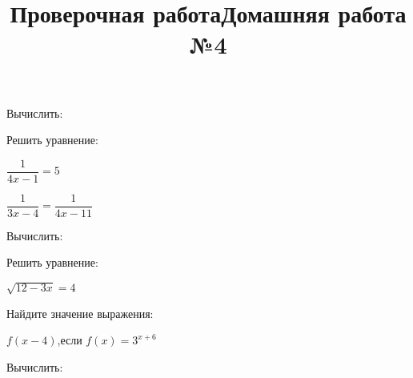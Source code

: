 \newpage
\title{Проверочная работа}
\begin{listofex}
	\item {}
	\item Вычислить:
	\begin{enumcols}[itemcolumns=2]
		\item {}
		\item {}
	\end{enumcols}
	\item {}
	\item Решить уравнение:
	\begin{enumcols}[itemcolumns=3]
		\item \( \dfrac{1}{4x-1}=5 \)
		\item \( \dfrac{1}{3x-4}=\dfrac{1}{4x-11} \)
		\item {}
	\end{enumcols}
	\item Вычислить:
	\begin{enumcols}[itemcolumns=3]
		\item {}
		\item {}
		\item {}
	\end{enumcols}
	\item Решить уравнение:
	\begin{enumcols}[itemcolumns=2]
		\item \( \sqrt{12-3x}=4 \)
		\item {}
	\end{enumcols}
	\item Найдите значение выражения:
	\begin{enumcols}[itemcolumns=1]
		\item {}
		\item \( f(x-4) \),\quad если \( f(x)=3^{x+6} \)
	\end{enumcols}
	\item Вычислить:
	\begin{enumcols}[itemcolumns=2]
		\item {}
		\item {}
	\end{enumcols}
	\item {}
\end{listofex}
\newpage
\title{Домашняя работа №4}
